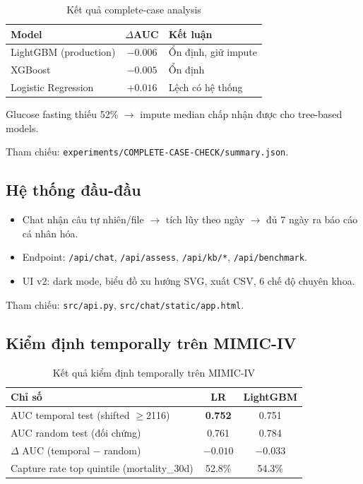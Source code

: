 \documentclass[13pt,a4paper]{article}
\begin{document}
\begin{table}[H]
\centering
\caption{Kết quả complete-case analysis}
\label{tab:complete_case}
\begin{tabular}{lcl}
\toprule
Model & $\Delta$AUC & Kết luận \\
\midrule
LightGBM (production) & $-0.006$ & Ổn định, giữ impute \\
XGBoost & $-0.005$ & Ổn định \\
Logistic Regression & $+0.016$ & Lệch có hệ thống \\
\bottomrule
\end{tabular}
\end{table}

Glucose fasting thiếu 52\% $\to$ impute median chấp nhận được cho tree-based models.

Tham chiếu: \texttt{experiments/COMPLETE-CASE-CHECK/summary.json}.

\subsection{Hệ thống đầu-đầu}

\begin{itemize}
    \item Chat nhận câu tự nhiên/file $\to$ tích lũy theo ngày $\to$ đủ 7 ngày ra báo cáo cá nhân hóa.
    \item Endpoint: \texttt{/api/chat}, \texttt{/api/assess}, \texttt{/api/kb/*}, \texttt{/api/benchmark}.
    \item UI v2: dark mode, biểu đồ xu hướng SVG, xuất CSV, 6 chế độ chuyên khoa.
\end{itemize}

Tham chiếu: \texttt{src/api.py}, \texttt{src/chat/static/app.html}.

\subsection{Kiểm định temporally trên MIMIC-IV}

\begin{table}[H]
\centering
\caption{Kết quả kiểm định temporally trên MIMIC-IV}
\label{tab:mimiciv_temporal}
\begin{tabular}{lcc}
\toprule
Chỉ số & LR & LightGBM \\
\midrule
AUC temporal test (shifted $\ge$2116) & \textbf{0.752} & 0.751 \\
AUC random test (đối chứng) & 0.761 & 0.784 \\
$\Delta$ AUC (temporal $-$ random) & \textbf{$-0.010$} & $-0.033$ \\
Capture rate top quintile (mortality\_30d) & 52.8\% & 54.3\% \\
\bottomrule
\end{tabular}
\end{table}
\end{document}
